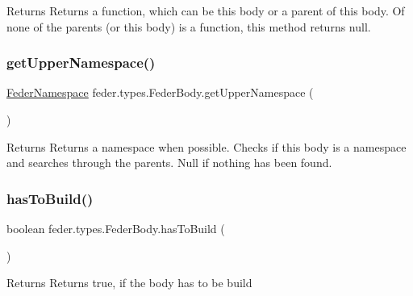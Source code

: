 \begin{DoxyReturn}{Returns}
Returns a function, which can be this body or a parent of this body. Of none of the parents (or this body) is a function, this method returns null. 
\end{DoxyReturn}
\mbox{\label{classfeder_1_1types_1_1FederBody_a8ab3e023c05b44cdfbd4e7f22aa9844b}} 
\subsubsection{\texorpdfstring{get\+Upper\+Namespace()}{getUpperNamespace()}}
{\footnotesize\ttfamily \hyperlink{classfeder_1_1types_1_1FederNamespace}{Feder\+Namespace} feder.\+types.\+Feder\+Body.\+get\+Upper\+Namespace (\begin{DoxyParamCaption}{ }\end{DoxyParamCaption})}

\begin{DoxyReturn}{Returns}
Returns a namespace when possible. Checks if this body is a namespace and searches through the parents. Null if nothing has been found. 
\end{DoxyReturn}
\mbox{\label{classfeder_1_1types_1_1FederBody_a8b34fc8b43bba9c859b9e7dc437c3983}} 
\subsubsection{\texorpdfstring{has\+To\+Build()}{hasToBuild()}}
{\footnotesize\ttfamily boolean feder.\+types.\+Feder\+Body.\+has\+To\+Build (\begin{DoxyParamCaption}{ }\end{DoxyParamCaption})}

\begin{DoxyReturn}{Returns}
Returns true, if the body has to be build 
\end{DoxyReturn}
\mbox{\label{classfeder_1_1types_1_1FederBody_a3a0f5cccf7ec89b1e0af8f958236c9aa}} 
